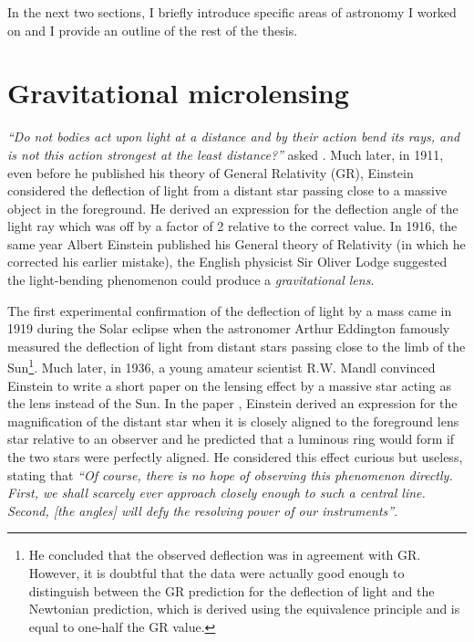 \documentclass[12pt,dvipsnames]{report}
\begin{document}
In the next two sections, I briefly introduce specific areas of astronomy I worked on 
and I provide an outline of the rest of the thesis.

\section{Gravitational microlensing}
\emph{``Do not bodies act upon light at a distance and by their action bend its rays,
    and is not this action strongest at the least distance?''} asked \citet{Newton1704}.
Much later, in 1911, even before he published his theory of General Relativity (GR), Einstein
considered the deflection of light from a distant star passing close
to a massive object in the foreground. He derived an expression for the deflection 
angle of the light ray which was off by a factor of 2 relative to the correct value.
In 1916, the same year Albert Einstein published his General theory of Relativity 
(in which he corrected his earlier mistake),
the English physicist Sir Oliver Lodge suggested the light-bending phenomenon could produce
a \emph{gravitational lens}. 

The first experimental confirmation of the deflection of light by a mass came
in 1919 during the Solar eclipse when the astronomer Arthur Eddington famously
measured the deflection of light from distant stars passing close to the limb
of the Sun\footnote{He concluded that the observed deflection was in agreement
    with GR. However, it is doubtful that the data were actually good enough to
    distinguish between the GR prediction for the deflection of light and the
    Newtonian prediction, which is derived using the equivalence principle and is
    equal to one-half the GR value.}. Much later, in 1936, a young amateur scientist
R.W. Mandl convinced Einstein to write a short paper on the lensing effect by
a massive star acting as the lens instead of the Sun. In the paper
\citep{1936Sci....84..506E}, Einstein derived an expression for the
magnification of the distant star when it is closely aligned to the foreground
lens star relative to an observer and he predicted that a luminous ring would
form if the two stars were perfectly aligned. He considered this effect curious
but useless, stating that \emph{``Of course, there is no hope of observing this
    phenomenon directly. First, we shall scarcely ever approach closely enough to
    such a central line. Second, [the angles] will defy the resolving power of our
    instruments''}.
\end{document}
